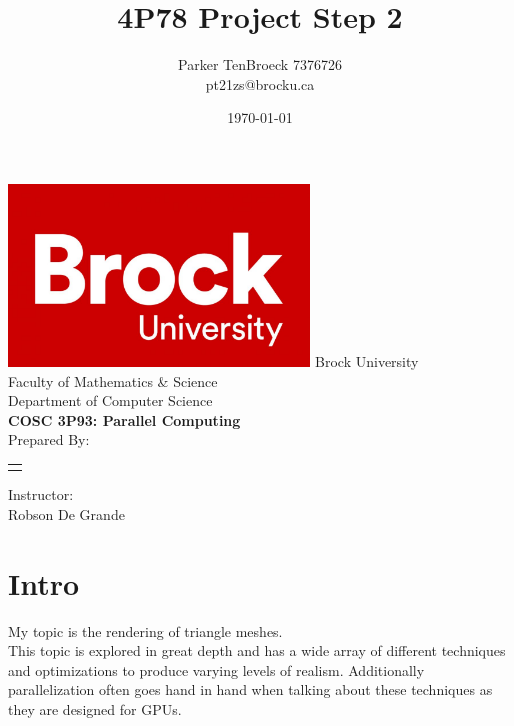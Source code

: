 \documentclass[12pt]{article}
\begin{document}
\title{4P78 Project Step 2}
\author{
    Parker TenBroeck 7376726\\
    pt21zs@brocku.ca
}
\date{\today}

\makeatletter
\begin{titlepage}
	\def \LOGOPATH {brock.jpg}
	\def \UNIVERSITY {Brock University}
	\def \FACULTY {Faculty of Mathematics \& Science}
	\def \DEPARTMENT {Department of Computer Science}
	\def \COURSETITLE {COSC 3P93: Parallel Computing}
	\def \SUPERVISOR {Robson De Grande}
	
	
	\vfill
	\begin{center}
		\includegraphics[width=0.6\textwidth]{brock.jpg}
		\fontsize{14pt}{14pt}\selectfont
		\vfill
		\UNIVERSITY \\
		\FACULTY \\
		\DEPARTMENT \\
		\vfill
		\fontsize{18pt}{18pt}\selectfont
		\textbf{\COURSETITLE} \\[0.5cm]
		\textbf{\@title}
		\vfill
		\fontsize{14pt}{14pt}\selectfont
		Prepared By: \\[0.5cm]
		
		\begin{tabular}[t]{c}
			\@author
		\end{tabular}\par
	
	    \vfill
		Instructor: \\
		\SUPERVISOR
		\vfill
		\@date
	\end{center}
\end{titlepage}
\makeatother

\newpage

\section{Intro}
My topic is the rendering of triangle meshes. \\

This topic is explored in great depth and has a wide array of different techniques and optimizations to produce varying levels of realism. Additionally parallelization often goes hand in hand when talking about these techniques as they are designed for GPUs. \\
\end{document}

